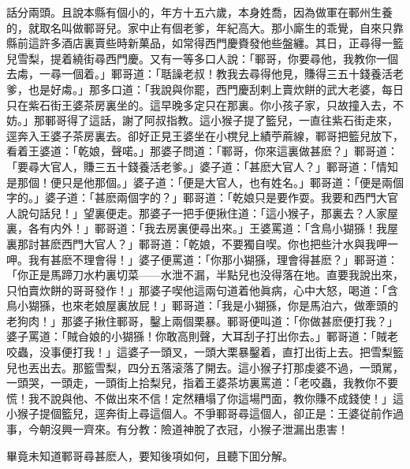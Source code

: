 話分兩頭。且說本縣有個小的，年方十五六歲，本身姓喬，因為做軍在鄆州生養的，就取名叫做鄆哥兒。家中止有個老爹，年紀高大。那小廝生的乖覺，自來只靠縣前這許多酒店裏賣些時新菓品，如常得西門慶賚發他些盤纏。其日，正尋得一籃兒雪梨，提着繞街尋西門慶。又有一等多口人說：「鄆哥，你要尋他，我教你一個去䖏，一尋一個着。」鄆哥道：「聒譟老叔！教我去尋得他見，賺得三五十錢養活老爹，也是好䖏。」那多口道：「我說與你罷，西門慶刮剌上賣炊餅的武大老婆，每日只在紫石街王婆茶房裏坐的。這早晚多定只在那裏。你小孩子家，只故撞入去，不妨。」那鄆哥得了這話，謝了阿叔指教。這小猴子提了籃兒，一直往紫石街走來，逕奔入王婆子茶房裏去。卻好正見王婆坐在小櫈兒上績苧蔴線，鄆哥把籃兒放下，看着王婆道：「乾娘，聲喏。」那婆子問道：「鄆哥，你來這裏做甚麽？」鄆哥道：「要尋大官人，賺三五十錢養活老爹。」婆子道：「甚麽大官人？」鄆哥道：「情知是那個！便只是他那個。」婆子道：「便是大官人，也有姓名。」鄆哥道：「便是兩個字的。」婆子道：「甚麽兩個字的？」鄆哥道：「乾娘只是要作耍。我要和西門大官人說句話兒！」望裏便走。那婆子一把手便揪住道：「這小猴子，那裏去？人家屋裏，各有内外！」鄆哥道：「我去房裏便尋出來。」王婆罵道：「含鳥小猢猻！我屋裏那討甚麽西門大官人？」鄆哥道：「乾娘，不要獨自喫。你也把些汁水與我呷一呷。我有甚麽不理會得！」婆子便罵道：「你那小猢猻，理會得甚麽？」鄆哥道：「你正是馬蹄刀水杓裏切菜——水泄不漏，半點兒也没得落在地。直要我說出來，只怕賣炊餅的哥哥發作！」那婆子喫他這兩句道着他眞病，心中大怒，喝道：「含鳥小猢猻，也來老娘屋裏放屁！」鄆哥道：「我是小猢猻，你是馬泊六，做牽頭的老狗肉！」那婆子揪住鄆哥，鑿上兩個栗暴。鄆哥便叫道：「你做甚麽便打我？」婆子罵道：「賊㒲娘的小猢猻！你敢高則聲，大耳刮子打出你去。」鄆哥道：「賊老咬蟲，没事便打我！」這婆子一頭叉，一頭大栗暴鑿着，直打出街上去。把雪梨籃兒也丟出去。那籃雪梨，四分五落滚落了開去。這小猴子打那虔婆不過，一頭駡，一頭哭，一頭走，一頭街上拾梨兒，指着王婆茶坊裏罵道：「老咬蟲，我教你不要慌！我不說與他、不做出來不信！定然糟塌了你這場門面，教你賺不成錢使！」這小猴子提個籃兒，逕奔街上尋這個人。不爭鄆哥尋這個人，卻正是：王婆従前作過事，今朝沒興一齊來。有分教：險道神脫了衣冠，小猴子泄漏出患害！

畢竟未知道鄆哥尋甚麽人，要知後項如何，且聽下囬分解。

